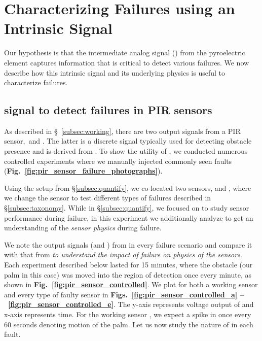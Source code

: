 \section{Characterizing Failures using an Intrinsic Signal}
\label{sec:aout_char}
Our hypothesis is that the intermediate analog signal (\aout) from the pyroelectric element captures information that is critical to detect various failures. 
We now describe how this intrinsic signal and its underlying physics is useful to characterize failures.

\subsection{\aout signal to detect failures in PIR sensors}
\label{subsec:controlled}
As described in \S~\ref{subsec:working}, there are two output signals from a PIR sensor,~\viz \aout and \cout. 
The latter is a discrete signal typically used for detecting obstacle presence and is derived from \aout.
To show the utility of \aout, we conducted numerous controlled experiments where we manually injected commonly seen faults ({\bfseries Fig.~\ref{fig:pir_sensor_failure_photographs}}). 




Using the setup from {\S\ref{subsec:quantify}}, we co-located two sensors, \tampered and \working, where we change the \tampered sensor to test different types of failures described in \S\ref{subsec:taxonomy}. While in \S\ref{subsec:quantify}, we focused on \cout to study sensor performance during failure, in this experiment we additionally analyze \aout to get an understanding of the \textit{sensor physics} during failure.

We note the output signals (\ie \aout and \cout) from \tampered in every failure scenario and compare it with that from \working \emph{to understand the impact of failure on physics of the sensors}. Each experiment described below lasted for 15 minutes, where the obstacle (our palm in this case) was moved into the region of detection once every minute, as shown in {\bfseries Fig.~\ref{fig:pir_sensor_controlled}}. We plot \aout for both a working sensor and every type of faulty sensor in {\bfseries Figs.~\ref{fig:pir_sensor_controlled_a} --~\ref{fig:pir_sensor_controlled_e}}. The y-axis represents voltage output of \aout and x-axis represents time. %
For the working sensor \working, we expect a spike in \aout once every 60 seconds denoting motion of the palm. Let us now study the nature of \aout in each fault.

